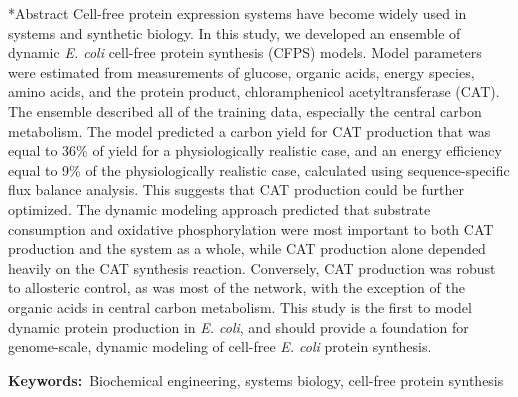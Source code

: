 \documentclass[12pt]{article}
\makeatletter
\renewcommand\section{\@startsection
	{subsection}{2}{0mm}
	{-0.2in}
	{0.05\baselineskip}
	{\normalfont\large\bfseries}}
\makeatother
\begin{document}
\section*{Abstract}
Cell-free protein expression systems have become widely used in systems and synthetic biology.
In this study, we developed an ensemble of dynamic \textit{E. coli} cell-free protein synthesis (CFPS) models.
Model parameters were estimated from measurements of glucose, organic acids, energy species, amino acids, and the protein product, chloramphenicol acetyltransferase (CAT).
The ensemble described all of the training data, especially the central carbon metabolism.
The model predicted a carbon yield for CAT production that was equal to 36\% of yield for a physiologically realistic case, and an energy efficiency equal to 9\% of the physiologically realistic case, calculated using sequence-specific flux balance analysis.
This suggests that CAT production could be further optimized.
The dynamic modeling approach predicted that substrate consumption and oxidative phosphorylation were most important to both CAT production and the system as a whole, while CAT production alone depended heavily on the CAT synthesis reaction.
Conversely, CAT production was robust to allosteric control, as was most of the network, with the exception of the organic acids in central carbon metabolism.
This study is the first to model dynamic protein production in \textit{E. coli}, and should provide a foundation for genome-scale,
dynamic modeling of cell-free \textit{E. coli} protein synthesis.

\vspace{0.1in}
{\noindent \textbf{Keywords:}~Biochemical engineering, systems biology, cell-free protein synthesis}

\pagebreak

\setcounter{page}{1}


\linenumbers
\end{document}
